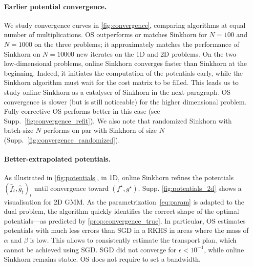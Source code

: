 \paragraph{Earlier potential convergence.}
We study convergence curves in \autoref{fig:convergence}, comparing algorithms
at equal number of multiplications. OS outperforms or matches Sinkhorn for $N=100$
and $N=1000$ on the three problems; it approximately matches the performance of
Sinkhorn on $N=10000$ new iterates on the 1D and 2D problems. On the two
low-dimensional problems, online Sinkhorn converges faster than Sinkhorn at the
beginning. Indeed, it initiates the computation of the potentials early, while the Sinkhorn
algorithm must wait for the cost matrix to be filled. This leads us
to study online Sinkhorn as a catalyser of Sinkhorn in the next paragraph. OS
convergence is slower (but is still noticeable) for the higher dimensional problem.
Fully-corrective OS performs better in this case (see Supp.~\autoref{fig:convergence_refit}). We also note that randomized Sinkhorn with batch-size $N$ performs on par with Sinkhorn of size $N$ (Supp.~\autoref{fig:convergence_randomized}).

\paragraph{Better-extrapolated potentials.} As illustrated in
\autoref{fig:potentials}, in 1D, online Sinkhorn refines the potentials $(\hat f_t, \hat g_t)_t$
until convergence toward $(f^\star, g^\star)$. Supp. \autoref{fig:potentials_2d} shows a visualisation for 2D GMM. As the parametrization~\eqref{eq:param} is
adapted to the dual problem, the algorithm quickly identifies the correct shape of
the optimal potentials---as predicted by \autoref{prop:convergence_true}. In
particular, OS estimates potentials with much less errors than SGD in a RKHS in
areas where the mass of $\alpha$ and $\beta$ is low. This allows to consistently estimate the transport plan, which cannot be achieved using SGD. SGD did not converge for $\epsilon < 10^{-1}$, while online Sinkhorn remains stable. OS does not require to set a bandwidth.

\setlength{\tabcolsep}{2pt}

